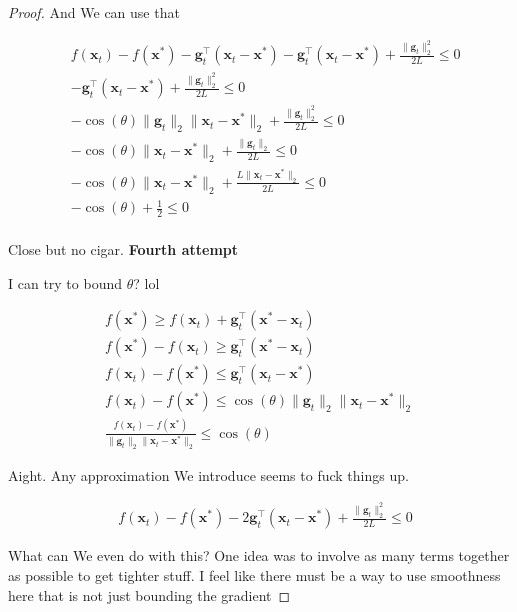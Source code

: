 \documentclass{article}
\begin{document}
\begin{proof}
	And We can use that
	
	\begin{align}
		&f(\mathbf{x}_t) - f(\mathbf{x}^*)  -\mathbf{g}^\top_t(\mathbf{x}_t - \mathbf{x}^*) -\mathbf{g}^\top_t(\mathbf{x}_t - \mathbf{x}^*) +\frac{\|\mathbf{g}_t\|^2_2}{2L} \le 0\\
		& -\mathbf{g}^\top_t(\mathbf{x}_t - \mathbf{x}^*) +\frac{\|\mathbf{g}_t\|^2_2}{2L} \le 0\\
		&- \cos(\theta)\|\mathbf{g}_t\|_2 \|\mathbf{x}_t-\mathbf{x}^*\|_2 +\frac{\|\mathbf{g}_t\|^2_2}{2L} \le 0\\
		&- \cos(\theta) \|\mathbf{x}_t-\mathbf{x}^*\|_2 +\frac{\|\mathbf{g}_t\|_2}{2L} \le 0\\
		&- \cos(\theta) \|\mathbf{x}_t-\mathbf{x}^*\|_2 +\frac{L\|\mathbf{x}_t-\mathbf{x}^*\|_2}{2L} \le 0\\
		&- \cos(\theta) +\frac{1}{2} \le 0\\
	\end{align}
	
	Close but no cigar. \textbf{Fourth attempt}
	
	I can try to bound $\theta$? lol
	
	\begin{align}
		f(\mathbf{x}^*) \ge f(\mathbf{x}_t) + \mathbf{g}_t^\top(\mathbf{x}^* - \mathbf{x}_t)\\
		f(\mathbf{x}^*) - f(\mathbf{x}_t)  \ge \mathbf{g}_t^\top(\mathbf{x}^* - \mathbf{x}_t)\\
		f(\mathbf{x}_t) -f(\mathbf{x}^*) \le \mathbf{g}_t^\top(\mathbf{x}_t - \mathbf{x}^* )\\
		f(\mathbf{x}_t) -f(\mathbf{x}^*) \le \cos(\theta)\|\mathbf{g}_t\|_2\|\mathbf{x}_t - \mathbf{x}^*\|_2\\
		\frac{f(\mathbf{x}_t) -f(\mathbf{x}^*)}{\|\mathbf{g}_t\|_2\|\mathbf{x}_t - \mathbf{x}^*\|_2} \le \cos(\theta)
	\end{align}
	
	
	Aight. Any approximation We introduce seems to fuck things up. 

	\begin{align}
		&f(\mathbf{x}_t) - f(\mathbf{x}^*)  - 2 \mathbf{g}^\top_t(\mathbf{x}_t - \mathbf{x}^*) +\frac{\|\mathbf{g}_t\|^2_2}{2L} \le 0
	\end{align}
	
	What can We even do with this? One idea was to involve as many terms  together as possible to get tighter stuff. I feel like there must be a way  to use smoothness here that is not just bounding the gradient
	

\end{proof}
\end{document}
